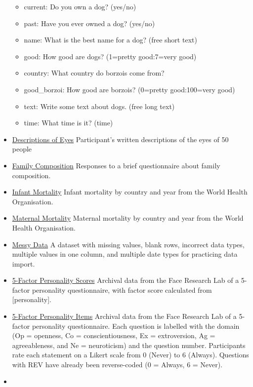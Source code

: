 \documentclass[
  oneside]{book}
\providecommand{\tightlist}{%
  \setlength{\itemsep}{0pt}\setlength{\parskip}{0pt}}
\begin{document}
\begin{itemize}
  \begin{itemize}
  \tightlist
  \item
    current: Do you own a dog? (yes/no)
  \item
    past: Have you ever owned a dog? (yes/no)
  \item
    name: What is the best name for a dog? (free short text)
  \item
    good: How good are dogs? (1=pretty good:7=very good)
  \item
    country: What country do borzois come from?
  \item
    good\_borzoi: How good are borzois? (0=pretty good:100=very good)
  \item
    text: Write some text about dogs. (free long text)
  \item
    time: What time is it? (time)
  \end{itemize}
\item
  \href{data/eye_descriptions.csv}{Descriptions of Eyes} Participant's written descriptions of the eyes of 50 people
\item
  \href{data/family_composition.csv}{Family Composition} Responses to a brief questionnaire about family composition.
\item
  \href{data/infmort.csv}{Infant Mortality} Infant mortality by country and year from the World Health Organisation.
\item
  \href{data/matmort.xls}{Maternal Mortality} Maternal mortality by country and year from the World Health Organisation.
\item
  \href{data/mess.csv}{Messy Data} A dataset with missing values, blank rows, incorrect data types, multiple values in one column, and multiple date types for practicing data import.
\item
  \href{data/personality_scores.csv}{5-Factor Personality Scores} Archival data from the Face Research Lab of a 5-factor personality questionnaire, with factor score calculated from {[}personality{]}.
\item
  \href{data/personality.csv}{5-Factor Personality Items} Archival data from the Face Research Lab of a 5-factor personality questionnaire. Each question is labelled with the domain (Op = openness, Co = conscientiousness, Ex = extroversion, Ag = agreeableness, and Ne = neuroticism) and the question number. Participants rate each statement on a Likert scale from 0 (Never) to 6 (Always). Questions with REV have already been reverse-coded (0 = Always, 6 = Never).
\item

\end{itemize}
\end{document}
